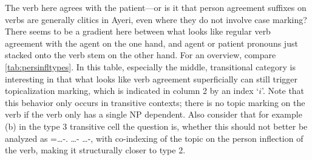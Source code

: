 The verb here agrees with the patient---or is it that person agreement suffixes
on verbs are generally clitics in Ayeri, even where they do not involve case
marking? There seems to be a gradient here between what looks like regular verb
agreement with the agent on the one hand, and agent or patient pronouns just
stacked onto the verb stem on the other hand. For an overview, compare
\autoref{tab:persinfltypes}. In this table, especially the middle,
transitional category is interesting in that what looks like verb agreement
superficially can still trigger topicalization marking, which is indicated in
column 2 by an index `$i$'. Note that this behavior only occurs in transitive
contexts; there is no topic marking on the verb if the verb only has a single
NP dependent. Also consider that for example (b) in the type 3 transitive
cell the question is, whether this should not better be analyzed as
\AgtT{}=…-\TsgM{}.\Top{} …-\Top{} …-\Parg{}, with co-indexing of the topic on 
the person inflection of the verb, making it structurally closer to type 2.

